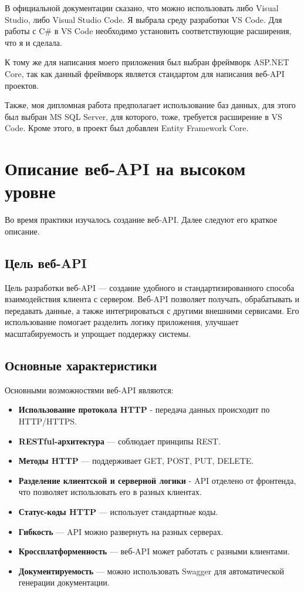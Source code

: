 \documentclass[a4paper,12pt]{report}
\begin{document}
В официальной документации сказано, что можно использовать либо Visual Studio, либо Visual Studio Code. Я выбрала среду разработки VS Code. 
Для работы с C\# в VS Code необходимо установить соответствующие расширения, что я и сделала.

К тому же для написания моего приложения был выбран фреймворк ASP.NET Core, так как данный фреймворк является стандартом для написания веб-\ac{API} проектов. 

Также, моя дипломная работа предполагает использование баз данных, для этого был выбран MS SQL Server, для которого, тоже, требуется расширение в VS Code. 
Кроме этого, в проект был добавлен Entity Framework Core.

\section{Описание веб-\ac{API} на высоком уровне}

Во время практики изучалось создание веб-\ac{API}. Далее следуют его краткое описание.

\subsection{Цель веб-\ac{API}}

Цель разработки веб-\ac{API} --- создание удобного и стандартизированного способа взаимодействия клиента с сервером. 
Веб-\ac{API} позволяет получать, обрабатывать и передавать данные, а также интегрироваться с другими внешними сервисами. 
Его использование помогает разделить логику приложения, улучшает масштабируемость и упрощает поддержку системы.

\subsection{Основные характеристики}

Основными возможностями веб-\ac{API} являются:
\begin{itemize}
  \item
      \textbf{Использование протокола \ac{HTTP}} - передача данных происходит по \ac{HTTP}/\ac{HTTPS}.
  \item
      \textbf{\ac{REST}ful-архитектура} --- соблюдает принципы \ac{REST}.
  \item
      \textbf{Методы \ac{HTTP}} --- поддерживает GET, POST, PUT, DELETE.
  \item
      \textbf{Разделение клиентской и серверной логики} - \ac{API} отделено от фронтенда, что позволяет использовать его в разных клиентах.
  \item
      \textbf{Статус-коды \ac{HTTP}} --- использует стандартные коды.
  \item
      \textbf{Гибкость} --- \ac{API} можно развернуть на разных серверах.
  \item
      \textbf{Кроссплатформенность} --- веб-\ac{API} может работать с разными клиентами.
  \item
      \textbf{Документируемость} --- можно использовать Swagger для автоматической генерации документации.
\end{itemize}
\end{document}
